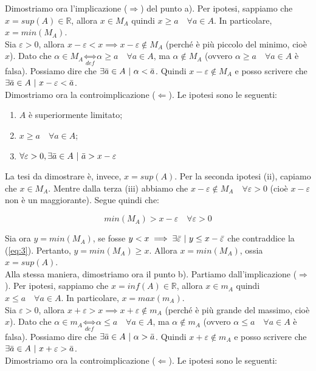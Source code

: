 \documentclass{article}
\begin{document}
\noindent Dimostriamo ora l'implicazione ($\Rightarrow$) del punto a). Per ipotesi, sappiamo che $x = sup(A) \in \mathbb{R}$, allora $x \in M_A$ quindi $x \geq a \quad \forall a \in A$. In particolare, $x = min(M_A)$. \\
Sia $\varepsilon > 0$, allora $x - \varepsilon < x \implies x - \varepsilon \notin M_A$ (perché è più piccolo del minimo, cioè $x$). Dato che $\alpha \in M_A \underset{def}{\Longleftrightarrow} \alpha \geq a \quad \forall a \in A$, ma $\alpha \notin M_A$ (ovvero $\alpha \geq a \quad \forall a \in A$ è falsa). Possiamo dire che $\exists \Bar{a} \in A \ | \ \alpha < \Bar{a}$. Quindi $x - \varepsilon \notin M_A$ e posso scrivere che $\exists \Bar{a} \in A \ | \ x - \varepsilon < \Bar{a}$.\\
Dimostriamo ora la controimplicazione ($\Leftarrow$). Le ipotesi sono le seguenti:

\begin{enumerate}[label=\roman*)]
    \item $A$ è superiormente limitato;
    \item $x \geq a \quad \forall a \in A$;
    \item $\forall \varepsilon > 0, \exists \Bar{a} \in A \ | \ \Bar{a} > x - \varepsilon$
\end{enumerate}

\noindent La tesi da dimostrare è, invece, $x = sup(A)$. Per la seconda ipotesi (ii), capiamo che $x \in M_A$. Mentre dalla terza (iii) abbiamo che $x - \varepsilon \notin M_A \quad \forall \varepsilon > 0$ (cioè $x - \varepsilon$ non è un maggiorante). Segue quindi che:

\begin{equation}
    min(M_A) > x - \varepsilon \quad \forall \varepsilon > 0
    \label{eq:3}
\end{equation}

\noindent Sia ora $y = min(M_A)$, se fosse $y < x \implies \exists \Bar{\varepsilon} \ | \ y \leq x - \Bar{\varepsilon}$ che contraddice la (\ref{eq:3}). Pertanto, $y = min(M_A) \geq x$. Allora $x = min(M_A)$, ossia $x = sup(A)$.\\

\noindent Alla stessa maniera, dimostriamo ora il punto b). Partiamo dall'implicazione ($\Rightarrow$). Per ipotesi, sappiamo che $x = inf(A) \in \mathbb{R}$, allora $x \in m_A$ quindi $x \leq a \quad \forall a \in A$. In particolare, $x = max(m_A)$.\\
Sia $\varepsilon > 0$, allora $x + \varepsilon > x \implies x + \varepsilon \notin m_A$ (perché è più grande del massimo, cioè $x$). Dato che $\alpha \in m_A \underset{def}{\Longleftrightarrow} \alpha \leq a \quad \forall a \in A$, ma $\alpha \notin m_A$ (ovvero $\alpha \leq a \quad \forall a \in A$ è falsa). Possiamo dire che $\exists \Bar{a} \in A \ | \ \alpha > \Bar{a}$. Quindi $x + \varepsilon \notin m_A$ e posso scrivere che $\exists \Bar{a} \in A \ | \ x + \varepsilon > \Bar{a}$.\\
Dimostriamo ora la controimplicazione ($\Leftarrow$). Le ipotesi sono le seguenti:
\end{document}
